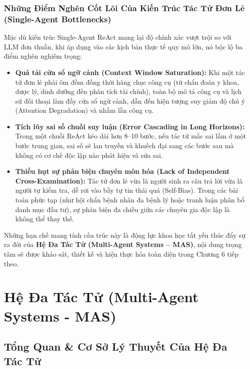 \documentclass[12pt,a4paper]{report}
\begin{document}
\subsection{Những Điểm Nghẽn Cốt Lõi Của Kiến Trúc Tác Tử Đơn Lẻ (Single-Agent Bottlenecks)}

Mặc dù kiến trúc Single-Agent ReAct mang lại độ chính xác vượt trội so với LLM đơn thuần, khi áp dụng vào các kịch bản thực tế quy mô lớn, nó bộc lộ ba điểm nghẽn nghiêm trọng:
\begin{itemize}[leftmargin=1.2cm]
    \item \textbf{Quá tải cửa sổ ngữ cảnh (Context Window Saturation):} Khi một tác tử đơn lẻ phải ôm đồm đồng thời hàng chục công cụ (từ chẩn đoán y khoa, dược lý, dinh dưỡng đến phân tích tài chính), toàn bộ mô tả công cụ và lịch sử đối thoại làm đầy cửa sổ ngữ cảnh, dẫn đến hiện tượng suy giảm độ chú ý (Attention Degradation) và nhầm lẫn công cụ.
    \item \textbf{Tích lũy sai số chuỗi suy luận (Error Cascading in Long Horizons):} Trong một chuỗi ReAct kéo dài hơn 8--10 bước, nếu tác tử mắc sai lầm ở một bước trung gian, sai số sẽ lan truyền và khuếch đại sang các bước sau mà không có cơ chế độc lập nào phát hiện và sửa sai.
    \item \textbf{Thiếu hụt sự phản biện chuyên môn hóa (Lack of Independent Cross-Examination):} Tác tử đơn lẻ vừa là người sinh ra câu trả lời vừa là người tự kiểm tra, dễ rơi vào bẫy tự tin thái quá (Self-Bias). Trong các bài toán phức tạp (như hội chẩn bệnh nhân đa bệnh lý hoặc tranh luận phân bổ danh mục đầu tư), sự phản biện đa chiều giữa các chuyên gia độc lập là không thể thay thế.
\end{itemize}

Những hạn chế mang tính cấu trúc này là động lực khoa học tất yếu thúc đẩy sự ra đời của \textbf{Hệ Đa Tác Tử (Multi-Agent Systems -- MAS)}, nội dung trọng tâm sẽ được khảo sát, thiết kế và hiện thực hóa toàn diện trong Chương 6 tiếp theo.


\chapter{Hệ Đa Tác Tử (Multi-Agent Systems - MAS)}

\section{Tổng Quan \& Cơ Sở Lý Thuyết Của Hệ Đa Tác Tử}
\end{document}
